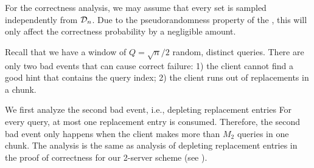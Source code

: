     
For the correctness analysis, 
we may assume that every set
is sampled independently from $\mathcal{D}_n$. 
Due to the pseudorandomness property of the \ppps,
this will only affect the correctness probability 
by a negligible amount.
   
Recall that we have a window of $Q = \sqrt{n}/2$
random, distinct queries.
    There are only two 
bad events that can cause correct failure: 
1) the client cannot find a good hint that contains the query index; 2) the client runs out of replacements in a chunk.

    We first analyze the second bad event, i.e., depleting replacement entries
For every query, at most one replacement
entry is consumed. 
Therefore, the second bad event  
only happens when the client makes more than $M_2$ queries in one chunk. 
The analysis is the same 
as analysis of depleting replacement entries
in the proof of correctness 
for our 2-server scheme (see ).
    
